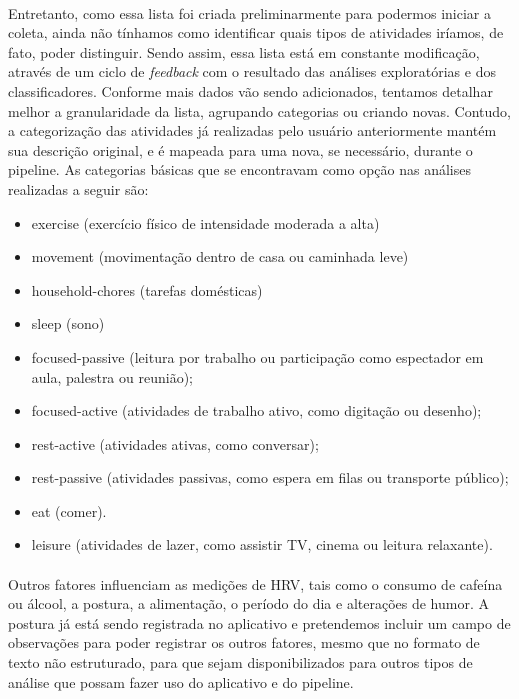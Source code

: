             \paragraph{} Entretanto, como essa lista foi criada preliminarmente para podermos iniciar a coleta, ainda não tínhamos como identificar quais tipos de atividades iríamos, de fato, poder distinguir. Sendo assim, essa lista está em constante modificação, através de um ciclo de \textit{feedback} com o resultado das análises exploratórias e dos classificadores. Conforme mais dados vão sendo adicionados, tentamos detalhar melhor a granularidade da lista, agrupando categorias ou criando novas. Contudo, a categorização das atividades já realizadas pelo usuário anteriormente mantém sua descrição original, e é mapeada para uma nova, se necessário, durante o pipeline. As categorias básicas que se encontravam como opção nas análises realizadas a seguir são:
                \begin{itemize} 
                    \item exercise (exercício físico de intensidade moderada a alta)
                    \item movement (movimentação dentro de casa ou caminhada leve)
                    \item household-chores (tarefas domésticas)
                    \item sleep (sono)
                    \item focused-passive (leitura por trabalho ou participação como espectador em aula, palestra ou reunião);
                    \item focused-active (atividades de trabalho ativo, como digitação ou desenho);
                    \item rest-active (atividades ativas, como conversar);
                    \item rest-passive (atividades passivas, como espera em filas ou transporte público);
                    \item eat (comer).
                    \item leisure (atividades de lazer, como assistir TV, cinema ou leitura relaxante).
                \end{itemize}
            
            \paragraph{} Outros fatores influenciam as medições de HRV, tais como o consumo de cafeína ou álcool, a postura, a alimentação, o período do dia e alterações de humor. A postura já está sendo registrada no aplicativo e pretendemos incluir um campo de observações para poder registrar os outros fatores, mesmo que no formato de texto não estruturado, para que sejam disponibilizados para outros tipos de análise que possam fazer uso do aplicativo e do pipeline.
            

